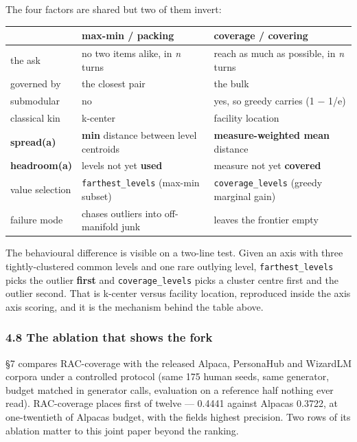 \documentclass[
  10pt,
]{article}
\theoremstyle{plain}
\theoremstyle{definition}
\begin{document}
The four factors are shared but two of them invert:

{\footnotesize
\begin{longtable}[]{@{}>{\raggedright\arraybackslash}p{}>{\raggedright\arraybackslash}p{}>{\raggedright\arraybackslash}p{}@{}}
\toprule\noalign{}
& max-min / packing & coverage / covering \\
\midrule\noalign{}
\endhead
\bottomrule\noalign{}
\endlastfoot
the ask & no two items alike, in \emph{n} turns & reach as much as
possible, in \emph{n} turns \\
governed by & the closest pair & the bulk \\
submodular & no & yes, so greedy carries (1 − 1/e) \\
classical kin & k-center & facility location \\
\textbf{spread(a)} & \textbf{min} distance between level centroids &
\textbf{measure-weighted mean} distance \\
\textbf{headroom(a)} & levels not yet \textbf{used} & measure not yet
\textbf{covered} \\
value selection & \texttt{farthest\_levels} (max-min subset) &
\texttt{coverage\_levels} (greedy marginal gain) \\
failure mode & chases outliers into off-manifold junk & leaves the
frontier empty \\
\end{longtable}}

The behavioural difference is visible on a two-line test. Given an axis
with three tightly-clustered common levels and one rare outlying level,
\texttt{farthest\_levels} picks the outlier \textbf{first} and
\texttt{coverage\_levels} picks a cluster centre first and the outlier
second. That is k-center versus facility location, reproduced inside the
axis axis scoring, and it is the mechanism behind the table above.

\subsubsection{4.8 The ablation that shows the
fork}\label{48-the-ablation-that-shows-the-fork}

§7 compares RAC-coverage with the released Alpaca, PersonaHub and
WizardLM corpora under a controlled protocol (same 175 human seeds, same
generator, budget matched in generator calls, evaluation on a reference
half nothing ever read). RAC-coverage places first of twelve --- 0.4441
against Alpaca\textquotesingle s 0.3722, at one-twentieth of
Alpaca\textquotesingle s budget, with the field\textquotesingle s
highest precision. Two rows of its ablation matter to this joint paper
beyond the ranking.
\end{document}
